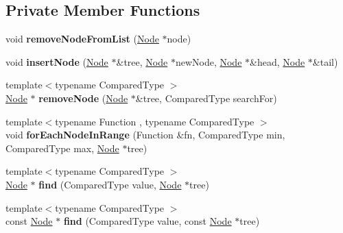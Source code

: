 \subsection*{Private Member Functions}
\begin{DoxyCompactItemize}
\item 
\hypertarget{classbalanced__tree_a84c40dc2f9f67ca1e497be043d895bb7}{void {\bfseries remove\+Node\+From\+List} (\hyperlink{structbalanced__tree_1_1Node}{Node} $\ast$node)}\label{classbalanced__tree_a84c40dc2f9f67ca1e497be043d895bb7}

\item 
\hypertarget{classbalanced__tree_ad9d6cfaa8465b10f4d7af64f67d12459}{void {\bfseries insert\+Node} (\hyperlink{structbalanced__tree_1_1Node}{Node} $\ast$\&tree, \hyperlink{structbalanced__tree_1_1Node}{Node} $\ast$new\+Node, \hyperlink{structbalanced__tree_1_1Node}{Node} $\ast$\&head, \hyperlink{structbalanced__tree_1_1Node}{Node} $\ast$\&tail)}\label{classbalanced__tree_ad9d6cfaa8465b10f4d7af64f67d12459}

\item 
\hypertarget{classbalanced__tree_a95ae2ef8697fe9e975d5377a30caf247}{{\footnotesize template$<$typename Compared\+Type $>$ }\\\hyperlink{structbalanced__tree_1_1Node}{Node} $\ast$ {\bfseries remove\+Node} (\hyperlink{structbalanced__tree_1_1Node}{Node} $\ast$\&tree, Compared\+Type search\+For)}\label{classbalanced__tree_a95ae2ef8697fe9e975d5377a30caf247}

\item 
\hypertarget{classbalanced__tree_aa4c24f815c95665a8f35691513cd7e00}{{\footnotesize template$<$typename Function , typename Compared\+Type $>$ }\\void {\bfseries for\+Each\+Node\+In\+Range} (Function \&fn, Compared\+Type min, Compared\+Type max, \hyperlink{structbalanced__tree_1_1Node}{Node} $\ast$tree)}\label{classbalanced__tree_aa4c24f815c95665a8f35691513cd7e00}

\item 
\hypertarget{classbalanced__tree_a1bc9d413659bcf9510bce1379e60a366}{{\footnotesize template$<$typename Compared\+Type $>$ }\\\hyperlink{structbalanced__tree_1_1Node}{Node} $\ast$ {\bfseries find} (Compared\+Type value, \hyperlink{structbalanced__tree_1_1Node}{Node} $\ast$tree)}\label{classbalanced__tree_a1bc9d413659bcf9510bce1379e60a366}

\item 
\hypertarget{classbalanced__tree_a6d87614476d3b94af187c75edb2bca66}{{\footnotesize template$<$typename Compared\+Type $>$ }\\const \hyperlink{structbalanced__tree_1_1Node}{Node} $\ast$ {\bfseries find} (Compared\+Type value, const \hyperlink{structbalanced__tree_1_1Node}{Node} $\ast$tree)}\label{classbalanced__tree_a6d87614476d3b94af187c75edb2bca66}

\end{DoxyCompactItemize}
